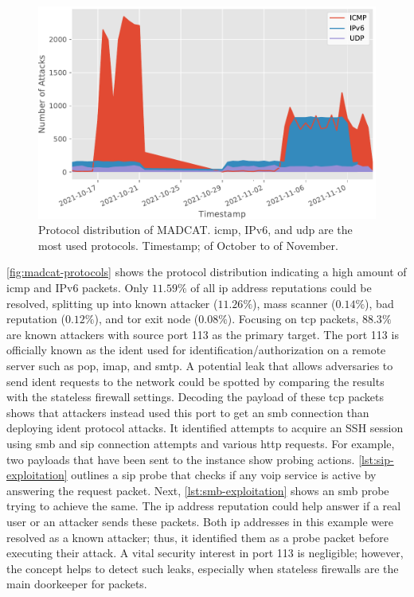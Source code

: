 \begin{figure}[htbp]
    \centering
    \includegraphics[width=\textwidth]{figures/madcat-protocol-usage.pdf}
    \caption[Protocol distribution of MADCAT]{
        Protocol distribution of MADCAT. \ac{icmp}, IPv6, and \ac{udp} are the most used protocols.
        Timestamp;  of October to  of November.
    }
    \label{fig:madcat-protocols}
\end{figure}

\autoref{fig:madcat-protocols} shows the protocol distribution indicating a high amount of \ac{icmp} and IPv6 packets.
Only $11.59\%$ of all \ac{ip} address reputations could be resolved, splitting up into known attacker ($11.26\%$), mass scanner ($0.14\%$), bad reputation ($0.12\%$), and tor exit node ($0.08\%$).
Focusing on \ac{tcp} packets, $88.3\%$ are known attackers with source port 113 as the primary target.
The port 113 is officially known as the \ac{ident}\cite{rfc1413} used for identification/authorization on a remote server such as \ac{pop}, \ac{imap}, and \ac{smtp}.
A potential leak that allows adversaries to send \ac{ident} requests to the network could be spotted by comparing the results with the stateless firewall settings.
Decoding the payload of these \ac{tcp} packets shows that attackers instead used this port to get an \ac{smb} connection than deploying \ac{ident} protocol attacks.
It identified attempts to acquire an SSH session using \ac{smb} and \ac{sip} connection attempts and various \ac{http} requests.
For example, two payloads that have been sent to the instance show probing actions.
\autoref{lst:sip-exploitation} outlines a \ac{sip} probe that checks if any \ac{voip} service is active by answering the request packet.
Next, \autoref{lst:smb-exploitation} shows an \ac{smb} probe trying to achieve the same.
The \ac{ip} address reputation could help answer if a real user or an attacker sends these packets.
Both \ac{ip} addresses in this example were resolved as a known attacker; thus, it identified them as a probe packet before executing their attack.
A vital security interest in port 113 is negligible; however, the concept helps to detect such leaks, especially when stateless firewalls are the main doorkeeper for packets.

